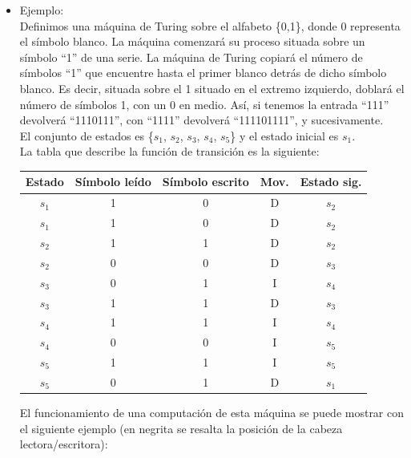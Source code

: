 \documentclass[12pt,a4paper,spanish]{book}
\begin{document}
\begin{itemize}
\begin{itemize}
\end{itemize}
Existen en la literatura un abundante n\'umero de definiciones alternativas, pero todas ellas tienen el mismo poder computacional, por ejemplo se puede a\~nadir el s\'imbolo S como s\'imbolo de ``no movimiento'' en un paso de c\'omputo o el s\'imbolo $\Sigma$ para indicar el alfabeto de entrada.
\newpage
\item Ejemplo:\\
\newline
Definimos una m\'aquina de Turing sobre el alfabeto \{0,1\}, donde 0 representa el s\'imbolo blanco. La m\'aquina comenzar\'a su proceso situada sobre un s\'imbolo ``1'' de una serie. La m\'aquina de Turing copiar\'a el n\'umero de s\'imbolos ``1'' que encuentre hasta el primer blanco detr\'as de dicho s\'imbolo blanco. Es decir, situada sobre el 1 situado en el extremo izquierdo, doblar\'a el n\'umero de s\'imbolos 1, con un 0 en medio. As\'i, si tenemos la entrada ``111'' devolver\'a ``1110111'', con ``1111'' devolver\'a ``111101111'', y sucesivamente.\\
El conjunto de estados es \{$s_1$, $s_2$, $s_3$, $s_4$, $s_5$\} y el estado inicial es $s_1$.\\
\newline
La tabla que describe la funci\'on de transici\'on es la siguiente:\\
\begin{center}
\begin{tabular}{||c|c|c|c|c||}
\hline
Estado & S\'imbolo le\'ido & S\'imbolo escrito & Mov. & Estado sig. \\
\hline
$s_{1}$ & 1 & 0 & D & $s_{2}$ \\
\hline
$s_{1}$ & 1 & 0 & D & $s_{2}$ \\
\hline
$s_{2}$ & 1 & 1 & D & $s_{2}$ \\
\hline
$s_{2}$ & 0 & 0 & D & $s_{3}$ \\
\hline
$s_{3}$ & 0 & 1 & I & $s_{4}$ \\
\hline
$s_{3}$ & 1 & 1 & D & $s_{3}$ \\
\hline
$s_{4}$ & 1 & 1 & I & $s_{4}$ \\
\hline
$s_{4}$ & 0 & 0 & I & $s_{5}$ \\
\hline
$s_{5}$ & 1 & 1 & I & $s_{5}$ \\
\hline
$s_{5}$ & 0 & 1 & D & $s_{1}$ \\
\hline
\end{tabular}
\end{center}
\newpage 
El funcionamiento de una computaci\'on de esta m\'aquina se puede mostrar con el siguiente ejemplo (en negrita se resalta la posici\'on de la cabeza lectora/escritora):\\

\end{itemize}
\end{document}
